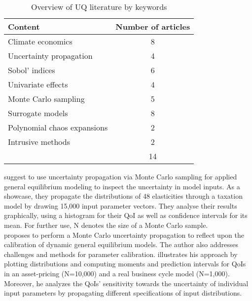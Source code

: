 \begin{table}[H]
	\centering
	\caption{Overview of UQ literature by keywords}
	\label{tab:lit}
	\renewcommand{\arraystretch}{1.2}%
	\begin{tabular}{lc}
		\toprule
		Content                     & \multicolumn{1}{l}{Number of articles} \\ \midrule
		\rowcolor[gray]{.9} 		Climate economics           &
		8 
		\\
		Uncertainty propagation     & 4                                    \\
		\rowcolor[gray]{.9} Sobol' indices              & 6                                    \\
		Univariate effects          & 4                                    \\
		\rowcolor[gray]{.9} Monte Carlo sampling                & 5                                    \\
		Surrogate models             & 8                                    \\
		\rowcolor[gray]{.9} Polynomial chaos expansions & 2                                    \\
		Intrusive methods            & 2                                    \\
		\midrule
		& 14                                   \\
		\bottomrule
	\end{tabular}
\end{table}
\noindent
\cite{Harrison.1992} suggest to use uncertainty propagation via Monte Carlo sampling for applied general equilibrium modeling to inspect the uncertainty in model inputs. As a showcase, they propagate the distributions of 48 elasticities through a taxation model by drawing 15,000 input parameter vectors. They analyse their results graphically, using a histogram for their QoI as well as confidence intervals for its mean. For further use, N denotes the size of a Monte Carlo sample.\\
\newline
\cite{Canova.1994} proposes to perform a Monte Carlo uncertainty propagation to reflect upon the calibration of dynamic general equilibrium models. The author also addresses challenges and methods for parameter calibration. \citeauthor{Canova.1994} illustrates his approach by plotting distributions and computing moments and prediction intervals for QoIs in an asset-pricing (N=10,000) and a real business cycle model (N=1,000). Moreover, he analyzes the QoIs' sensitivity towards the uncertainty of individual input parameters by propagating different specifications of input distributions.\\
